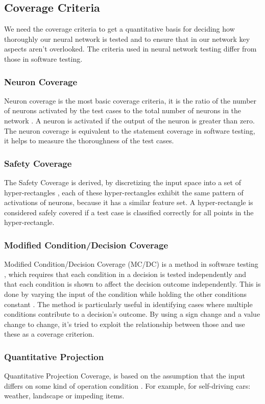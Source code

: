 \subsection*{Coverage Criteria}\label{subsec:coverage-criteria}
We need the coverage criteria to get a quantitative basis for deciding how thoroughly our neural network is tested and to ensure that in our network key aspects aren't overlooked.
The criteria used in neural network testing differ from those in software testing.

\subsubsection{Neuron Coverage}
Neuron coverage is the most basic coverage criteria, it is the ratio of the number of neurons activated by the test cases to the total number of neurons in the network \cite{pei_deepxplore_2017}.
A neuron is activated if the output of the neuron is greater than zero.
The neuron coverage is equivalent to the statement coverage in software testing, it helps to measure the thoroughness of the test cases.

\subsubsection{Safety Coverage}
The Safety Coverage is derived, by discretizing the input space into a set of hyper-rectangles \cite{beyer_feature-guided_2018}, each of these hyper-rectangles exhibit the same pattern of activations of neurons, because it has a similar feature set.
A hyper-rectangle is considered safely covered if a test case is classified correctly for all points in the hyper-rectangle.
\subsubsection{Modified Condition/Decision Coverage}
Modified Condition/Decision Coverage (MC/DC) is a method in software testing \cite{hayhurst_practical_2001}, which requires that each condition in a decision is tested independently and that each condition is shown to affect the decision outcome independently.
This is done by varying the input of the condition while holding the other conditions constant \cite{sun_deepconcolic_2019}.
The method is particularly useful in identifying cases where multiple conditions contribute to a decision's outcome.
By using a sign change and a value change to change, it's tried to exploit the relationship between those and use these as a coverage criterion.
\subsubsection{Quantitative Projection}
Quantitative Projection Coverage, is based on the assumption that the input differs on some kind of operation condition \cite{cheng_manifesting_2018}.
For example, for self-driving cars: weather, landscape or impeding items.

